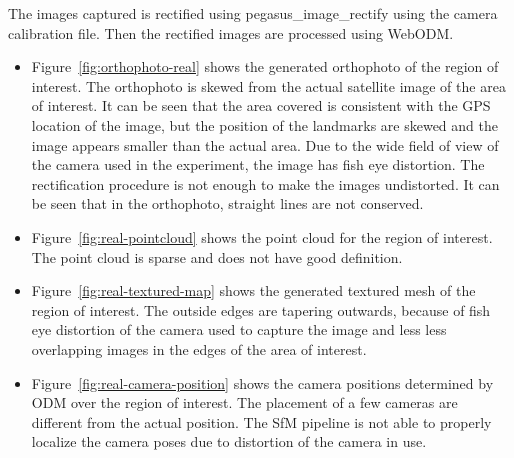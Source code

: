 The images captured is rectified using pegasus\_image\_rectify using the camera calibration file. Then the rectified images are processed using WebODM.
\begin{itemize}
	\item Figure~\ref{fig:orthophoto-real} shows the generated orthophoto of the region of interest. The orthophoto is skewed from the actual satellite image of the area of interest. It can be seen that the area covered is consistent with the GPS location of the image, but the position of the landmarks are skewed and the image appears smaller than the actual area. Due to the wide field of view of the camera used in the experiment, the image has fish eye distortion. The rectification procedure is not enough to make the images undistorted. It can be seen that in the orthophoto, straight lines are not conserved.
	\item Figure~\ref{fig:real-pointcloud} shows the point cloud for the region of interest. The point cloud is sparse and does not have good definition. 
	\item Figure~\ref{fig:real-textured-map} shows the generated textured mesh of the region of interest. The outside edges are tapering outwards, because of fish eye distortion of the camera used to capture the image and less less overlapping images in the edges of the area of interest.
	\item Figure~\ref{fig:real-camera-position} shows the camera positions determined by ODM over the region of interest. The placement of a few cameras are different from the actual position. The SfM pipeline is not able to properly localize the camera poses due to distortion of the camera in use.
\end{itemize}


